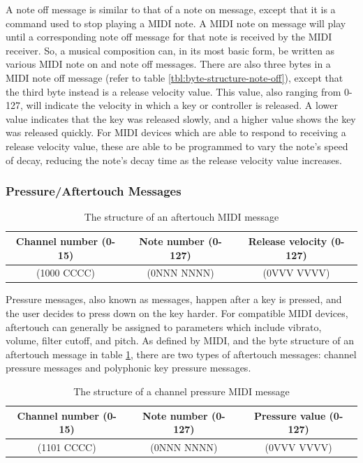 A note off message is similar to that of a note on message, except that it is a command used to stop playing a MIDI note. A MIDI note on message will play until a corresponding note off message for that note is received by the MIDI receiver. So, a musical composition can, in its most basic form, be written as various MIDI note on and note off messages. There are also three bytes in a MIDI note off message (refer to table \ref{tbl:byte-structure-note-off}), except that the third byte instead is a release velocity value. This value, also ranging from 0-127, will indicate the velocity in which a key or controller is released. A lower value indicates that the key was released slowly, and a higher value shows the key was released quickly. For MIDI devices which are able to respond to receiving a release velocity value, these are able to be programmed to vary the note's speed of decay, reducing the note's decay time as the release velocity value increases\cite{Kirk_Hunt_2013}. %

\subsubsection{Pressure/Aftertouch Messages}

\begin{table}
	\centering
	\begin{tabular}{|c|c|c|}
	\hline
		Channel number (0-15) & Note number (0-127) & Release velocity (0-127) \\
		\hline
		(1000 CCCC) & (0NNN NNNN) & (0VVV VVVV) \\
	\hline
	\end{tabular}
	\caption{The structure of an aftertouch MIDI message}
	\label{tbl:byte-structure-aftertouch}
\end{table}

Pressure messages, also known as  messages, happen after a key is pressed, and the user decides to press down on the key harder. For compatible MIDI devices, aftertouch can generally be assigned to parameters which include vibrato, volume, filter cutoff, and pitch. As defined by MIDI, and the byte structure of an aftertouch message in table \ref{tbl:byte-structure-aftertouch}, there are two types of aftertouch messages: channel pressure messages and polyphonic key pressure messages\cite{Huber_2012}. %

\begin{table}
	\centering
	\begin{tabular}{|c|c|c|}
	\hline
		Channel number (0-15) & Note number (0-127) & Pressure value (0-127) \\
		\hline
		(1101 CCCC) & (0NNN NNNN) & (0VVV VVVV) \\
	\hline
	\end{tabular}
	\caption{The structure of a channel pressure MIDI message}
	\label{tbl:byte-structure-channel-pressure-messages}
\end{table}

